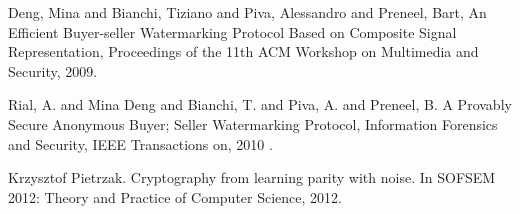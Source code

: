 \documentclass[dvips,12pt]{article}
\begin{document}
\begin{thebibliography}{99}
	Deng, Mina and Bianchi, Tiziano and Piva, Alessandro and Preneel, Bart,
	An Efficient Buyer-seller Watermarking Protocol Based on Composite Signal Representation,
	Proceedings of the 11th ACM Workshop on Multimedia and Security,
	2009.
	
	Rial, A. and Mina Deng and Bianchi, T. and Piva, A. and Preneel, B.
	A Provably Secure Anonymous Buyer; Seller Watermarking Protocol,
	Information Forensics and Security, IEEE Transactions on,
	2010	.	

	Krzysztof Pietrzak. 
	Cryptography from learning parity with noise.
	In SOFSEM 2012: Theory and Practice of Computer Science,
	2012.
	

\end{thebibliography}
\end{document}
